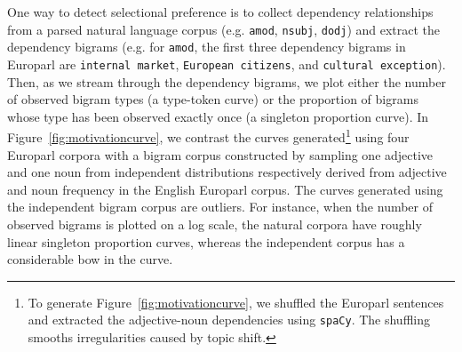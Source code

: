 \documentclass[11pt]{article}
\begin{document}
One way to detect selectional preference \cite{teh-2006-hierarchical} is to collect dependency relationships from a parsed natural language corpus (e.g. \texttt{amod}, \texttt{nsubj}, \texttt{dodj}) and extract the dependency bigrams (e.g. for \texttt{amod}, the first three dependency bigrams in Europarl are \texttt{internal market}, \texttt{European citizens}, and \texttt{cultural exception}). Then, as we stream through the dependency bigrams, we plot either the number of observed bigram types (a type-token curve) or the proportion of bigrams whose type has been observed exactly once (a singleton proportion curve). In Figure~\ref{fig:motivationcurve}, we contrast the curves generated\footnote{To generate Figure~\ref{fig:motivationcurve}, we shuffled the Europarl sentences and extracted the adjective-noun dependencies using \texttt{spaCy}. The shuffling smooths irregularities caused by topic shift.} using four Europarl corpora \cite{koehn-2005-europarl} with a bigram corpus constructed by sampling one adjective and one noun from independent distributions respectively derived from adjective and noun frequency in the English Europarl corpus. The curves generated using the independent bigram corpus are outliers. For instance, when the number of observed bigrams is plotted on a log scale, the natural corpora have roughly linear singleton proportion curves, whereas the independent corpus has a considerable bow in the curve.
\end{document}
